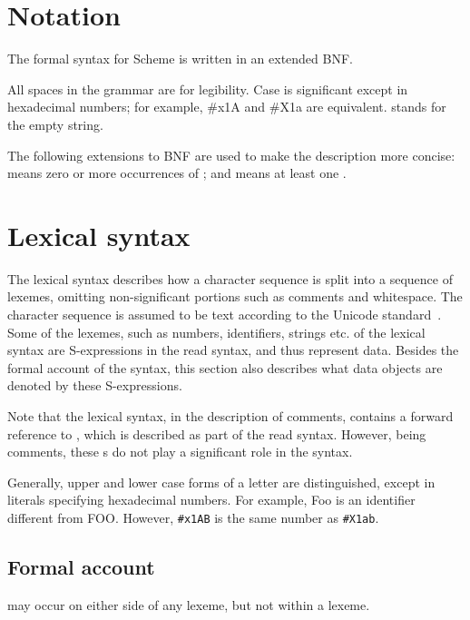 \section{Notation}
\label{BNF}

The formal syntax for Scheme is written in an extended BNF.

All spaces in the grammar are for legibility.  Case is significant
except in hexadecimal numbers; for example, {\cf \#x1A} and {\cf
  \#X1a} are equivalent.   stands for the empty string.

The following extensions to BNF are used to make the description more
concise:   means zero or more occurrences of
; and  means at least one
.

\section{Lexical syntax}
\label{lexicalsyntaxsection}

The lexical syntax describes how a character sequence is split into a
sequence of lexemes, omitting non-significant portions
such as comments and whitespace.  The character sequence is assumed to
be text according to the Unicode standard~\cite{Unicode41}.  Some of
the lexemes, such as numbers, identifiers, strings etc. of the lexical
syntax are S-expressions in the read syntax, and thus represent data.
Besides the formal account of the syntax, this section also describes
what data objects are denoted by these S-expressions.

Note that the lexical syntax, in the description of comments, contains
a forward reference to , which is described as part of the
read syntax.  However, being comments, these s do not play
a significant role in the syntax.

Generally, upper and lower case forms of a letter are distinguished,
except in literals specifying hexadecimal numbers.  For example, {\cf
  Foo} is an identifier different from {\cf FOO}.  However,
{\tt\#x1AB} is the same number as {\tt\#X1ab}.

\subsection{Formal account}
\label{lexicalgrammarsection}

 may occur on either side of any lexeme, but not
within a lexeme.

